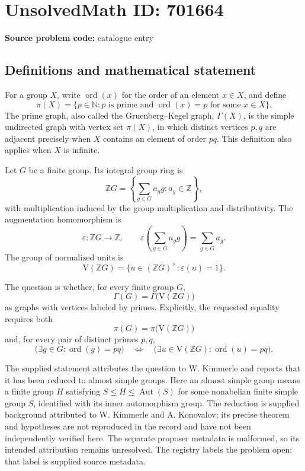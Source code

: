 \documentclass[11pt]{article}
\newcommand{\N}{\mathbb{N}}
\newcommand{\Z}{\mathbb{Z}}
\begin{document}
\section*{UnsolvedMath ID: 701664}
\textbf{Source problem code:} catalogue entry
\subsection{Definitions and mathematical statement}
For a group \(X\), write \(\operatorname{ord}(x)\) for the order of an element \(x\in X\), and define
\[
\pi(X)=\{p\in\N:p\text{ is prime and }\operatorname{ord}(x)=p\text{ for some }x\in X\}.
\]
The prime graph, also called the Gruenberg--Kegel graph, \(\Gamma(X)\), is the simple undirected graph with vertex set \(\pi(X)\), in which distinct vertices \(p,q\) are adjacent precisely when \(X\) contains an element of order \(pq\). This definition also applies when \(X\) is infinite.

Let \(G\) be a finite group. Its integral group ring is
\[
\Z G=\left\{\sum_{g\in G}a_g g:a_g\in\Z\right\},
\]
with multiplication induced by the group multiplication and distributivity. The augmentation homomorphism is
\[
\varepsilon:\Z G\longrightarrow\Z,\qquad
\varepsilon\!\left(\sum_{g\in G}a_g g\right)=\sum_{g\in G}a_g.
\]
The group of normalized units is
\[
\mathrm{V}(\Z G)=\{u\in(\Z G)^\times:\varepsilon(u)=1\}.
\]

The question is whether, for every finite group \(G\),
\[
\Gamma(G)=\Gamma\bigl(\mathrm{V}(\Z G)\bigr)
\]
as graphs with vertices labeled by primes. Explicitly, the requested equality requires both
\[
\pi(G)=\pi\bigl(\mathrm{V}(\Z G)\bigr)
\]
and, for every pair of distinct primes \(p,q\),
\[
\bigl(\exists g\in G:\operatorname{ord}(g)=pq\bigr)
\quad\Longleftrightarrow\quad
\bigl(\exists u\in\mathrm{V}(\Z G):\operatorname{ord}(u)=pq\bigr).
\]

The supplied statement attributes the question to W. Kimmerle and reports that it has been reduced to almost simple groups. Here an almost simple group means a finite group \(H\) satisfying \(S\leq H\leq\operatorname{Aut}(S)\) for some nonabelian finite simple group \(S\), identified with its inner automorphism group. The reduction is supplied background attributed to W. Kimmerle and A. Konovalov; its precise theorem and hypotheses are not reproduced in the record and have not been independently verified here. The separate proposer metadata is malformed, so its intended attribution remains unresolved. The registry labels the problem open; that label is supplied source metadata.
\end{document}

